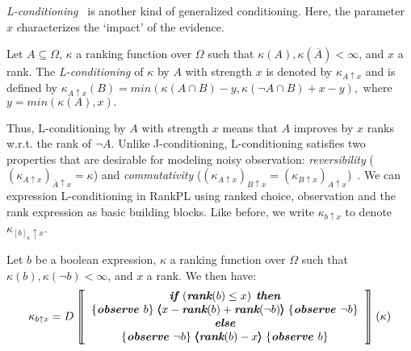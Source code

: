 \documentclass{llncs}
\newcommand{\mods}[2]{[#2]_{#1}}
\newcommand{\Rank}[1]{\hspace{3pt} \pmb{\langle} #1 \pmb{\rangle}\hspace{3pt} } %
\newcommand{\States}{\Omega}
\begin{document}
\emph{L-conditioning}~\cite{goldszmidt1996qualitative} %
is another kind of generalized conditioning.
Here, the parameter $x$ characterizes the `impact' of the evidence. %
\begin{definition}\label{defn:evidenceoriented}
Let $A \subseteq \Omega$, $\kappa$ a ranking function over $\Omega$ such that $\kappa(A), \kappa(\overline A) < \infty$, and $x$ a rank.
The \emph{L-conditioning} of $\kappa$ by $A$ with strength $x$ is denoted by $\kappa_{A \uparrow x}$ and is defined by
	$\kappa_{A \uparrow x}(B) = min ( \kappa(A \cap B) - y, \kappa(\neg A \cap B) + x - y ),$ %
where $y = min(\kappa(A), x).$
\end{definition}
Thus, L-conditioning by $A$ with strength $x$ means that $A$ improves by $x$ ranks w.r.t. the rank of $\neg A$.
Unlike J-conditioning, L-conditioning satisfies two properties 
that are desirable for modeling noisy observation:
	\textit{reversibility} ($(\kappa_{A \uparrow x})_{\overline{A} \uparrow x} = \kappa$) and 
	\textit{commutativity} ($(\kappa_{A \uparrow x})_{B \uparrow x} = (\kappa_{B \uparrow x})_{A \uparrow x}$)~\cite{DBLP:books/daglib/0035277}.
We can expression L-conditioning in RankPL using ranked choice, observation and the rank expression as basic building blocks.
Like before, we write $\kappa_{b \uparrow x}$ to denote $\kappa_{\mods{\kappa}{b} \uparrow x}$.
\begin{theorem}\label{thm:evidenceoriented}
Let $b$ be a boolean expression, $\kappa$ a ranking function over $\States$ such that $\kappa(b), \kappa(\neg b) < \infty$, and $x$ a rank.
We then have:
	$$\kappa_{b \uparrow x} = D
	\left\llbracket\begin{tabular}{c} 
	\mbox{$\emph{\textbf{if }}(\emph{\textbf{rank}}(b) \leq x)\emph{\textbf{ then}}$} \\ 
	\mbox{$\{\emph{\textbf{observe }}b \} \Rank{x - \emph{\textbf{rank}}(b) + \emph{\textbf{rank}}(\neg b)} \{ \emph{\textbf{observe }}\neg b\}$} \\
	\mbox{$\emph{\textbf{else}}$} \\
	\mbox{$\{\emph{\textbf{observe }}\neg b\} \Rank{\emph{\textbf{rank}}(b) - x} \{\emph{\textbf{observe }}b\}$} \\
	\end{tabular}\right\rrbracket(\kappa)$$
\end{theorem}
\end{document}
